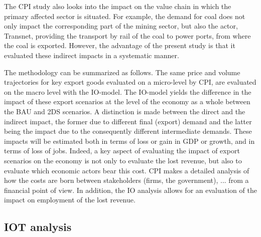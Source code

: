 \documentclass[12pt,english]{article}
\begin{document}
The CPI study also looks into the impact on the value chain in which the primary affected sector is situated. For example, the demand for coal does not only impact the corresponding part of the mining sector, but also the actor, Transnet, providing the transport by rail of the coal to power ports, from where the coal is exported. However, the advantage of the present study is that it evaluated these indirect impacts in a systematic manner.

The methodology can be summarized as follows. The same price and volume trajectories for key export goods %
evaluated on a micro-level by CPI, are evaluated on the macro level with the IO-model. The IO-model yields the difference in the impact of these export scenarios at the level of the economy as a whole between the BAU and 2DS scenarios. A distinction is made between the direct and the indirect impact, the former due to different final (export) demand and the latter being the impact due to the consequently different intermediate demands. These impacts will be estimated both in terms of loss or gain in GDP or growth, and in terms of loss of jobs. Indeed, a key aspect of evaluating the impact of export scenarios on the economy is not only to evaluate the lost revenue, but also to evaluate which economic actors bear this cost. CPI makes a detailed analysis of how the costs are born between stakeholders (firms, the government), ... from a financial point of view. In addition, the IO analysis allows for an evaluation of the impact on employment of the lost revenue. 





\subsection{IOT analysis}
\end{document}
